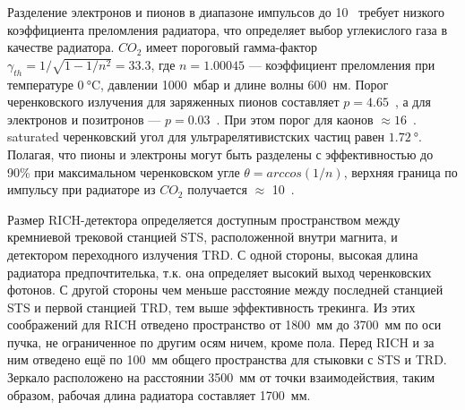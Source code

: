 Разделение электронов и пионов в диапазоне импульсов до 10~\GeVoverC{} требует низкого коэффициента преломления радиатора, что определяет выбор углекислого газа в качестве радиатора. $CO_{2}$ имеет пороговый гамма-фактор $\gamma _{th} = 1 / \sqrt{1 - 1/n^{2}} = 33.3$, где $n = 1.00045$ --- коэффициент преломления при температуре $\SI{0}{\degreeCelsius}$, давлении 1000~мбар и длине волны 600~нм. Порог черенковского излучения для заряженных пионов составляет $p = 4.65$~\GeVoverC, а для электронов и позитронов --- $p = 0.03$~\GeVoverC. При этом порог для каонов $\approx 16$~\GeVoverC. \todo saturated черенковский угол для ультрарелятивистских частиц равен $\SI{1.72}{\degree}$. Полагая, что пионы и электроны могут быть разделены с эффективностью до 90\% \todo при максимальном черенковском угле $\theta = arccos(1/n)$, верхняя граница по импульсу при радиаторе из $CO_{2}$ получается $\approx$ 10~\GeVoverC.


Размер RICH-детектора определяется доступным пространством между кремниевой трековой станцией STS, расположенной внутри магнита, и детектором переходного излучения TRD. С одной стороны, высокая длина радиатора предпочтителька, т.к. она определяет высокий выход черенковских фотонов. С другой стороны чем меньше расстояние между последней станцией STS и первой станцией TRD, тем выше эффективность трекинга. Из этих соображений для RICH отведено пространство от 1800~мм до 3700~мм по оси пучка, не ограниченное по другим осям ничем, кроме пола. Перед RICH и за ним отведено ещё по 100~мм общего пространства для стыковки с STS и TRD. Зеркало расположено на расстоянии 3500~мм от точки взаимодействия, таким образом, рабочая длина радиатора составляет 1700~мм.

